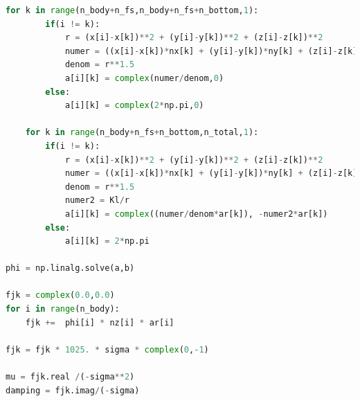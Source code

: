 \documentclass[a4paper]{article} %
\begin{document}
\begin{lstlisting}[language=Python, breaklines=true]
    for k in range(n_body+n_fs,n_body+n_fs+n_bottom,1):
        if(i != k):
            r = (x[i]-x[k])**2 + (y[i]-y[k])**2 + (z[i]-z[k])**2
            numer = ((x[i]-x[k])*nx[k] + (y[i]-y[k])*ny[k] + (z[i]-z[k])*nz[k])*ar[k]
            denom = r**1.5
            a[i][k] = complex(numer/denom,0)
        else:
            a[i][k] = complex(2*np.pi,0)
            
    for k in range(n_body+n_fs+n_bottom,n_total,1):
        if(i != k):
            r = (x[i]-x[k])**2 + (y[i]-y[k])**2 + (z[i]-z[k])**2
            numer = ((x[i]-x[k])*nx[k] + (y[i]-y[k])*ny[k] + (z[i]-z[k])*nz[k])*ar[k]
            denom = r**1.5
            numer2 = Kl/r
            a[i][k] = complex((numer/denom*ar[k]), -numer2*ar[k])
        else:
            a[i][k] = 2*np.pi

phi = np.linalg.solve(a,b)

fjk = complex(0.0,0.0)
for i in range(n_body):
    fjk +=  phi[i] * nz[i] * ar[i]

fjk = fjk * 1025. * sigma * complex(0,-1)

mu = fjk.real /(-sigma**2)
damping = fjk.imag/(-sigma)

\end{lstlisting}
\end{document}
